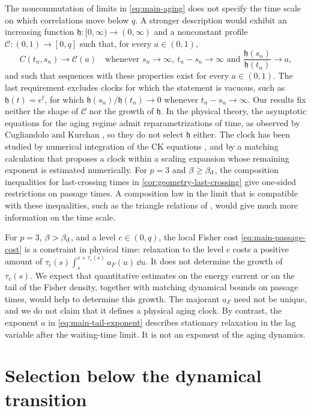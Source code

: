 The noncommutation of limits in \eqref{eq:main-aging} does not specify the time scale on which correlations move below $q$. A stronger description would exhibit an increasing function $\mathfrak h\colon[0,\infty)\to(0,\infty)$ and a nonconstant profile $\mathcal C\colon(0,1)\to[0,q]$ such that, for every $a\in(0,1)$,
\[
 C(t_n,s_n)\longrightarrow\mathcal C(a)
 \quad\text{whenever }s_n\to\infty,\ t_n-s_n\to\infty
 \text{ and }\frac{\mathfrak h(s_n)}{\mathfrak h(t_n)}\to a,
\]
and such that sequences with these properties exist for every $a\in(0,1)$. The last requirement excludes clocks for which the statement is vacuous, such as $\mathfrak h(t)=e^t$, for which $\mathfrak h(s_n)/\mathfrak h(t_n)\to0$ whenever $t_n-s_n\to\infty$. Our results fix neither the shape of $\mathcal C$ nor the growth of $\mathfrak h$. In the physical theory, the asymptotic equations for the aging regime admit reparametrizations of time, as observed by Cugliandolo and Kurchan \cite{ck1994}, so they do not select $\mathfrak h$ either. The clock has been studied by numerical integration of the CK equations \cite{kimlatz2001}, and by a matching calculation \cite{andreanovlefevre2006} that proposes a clock within a scaling expansion whose remaining exponent is estimated numerically. For $p=3$ and $\beta\ge\beta_{\mathrm d}$, the composition inequalities for last-crossing times in \cref{cor:geometry-last-crossing} give one-sided restrictions on passage times. A composition law in the limit that is compatible with these inequalities, such as the triangle relations of \cite{ck1994}, would give much more information on the time scale.

For $p=3$, $\beta>\beta_{\mathrm d}$, and a level $c\in(0,q)$, the local Fisher cost \eqref{eq:main-passage-cost} is a constraint in physical time: relaxation to the level $c$ costs a positive amount of $\tau_c(s)\int_s^{s+\tau_c(s)}a_F(u)\,\dd u$. It does not determine the growth of $\tau_c(s)$. We expect that quantitative estimates on the energy current or on the tail of the Fisher density, together with matching dynamical bounds on passage times, would help to determine this growth. The majorant $a_F$ need not be unique, and we do not claim that it defines a physical aging clock. By contrast, the exponent $a$ in \eqref{eq:main-tail-exponent} describes stationary relaxation in the lag variable after the waiting-time limit. It is not an exponent of the aging dynamics.

\section{Selection below the dynamical transition}\label{sec:discussion-below}

